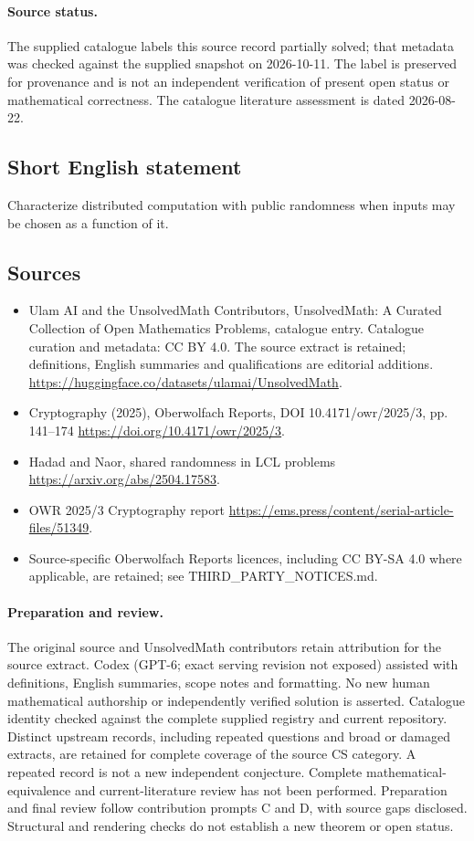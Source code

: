 \documentclass[11pt]{article}
\begin{document}
\paragraph{Source status.}
The supplied catalogue labels this source record partially solved; that metadata was checked against the supplied snapshot on 2026-10-11. The label is preserved for provenance and is not an independent verification of present open status or mathematical correctness. The catalogue literature assessment is dated 2026-08-22.
\subsection{Short English statement}
Characterize distributed computation with public randomness when inputs may be chosen as a function of it.
\subsection{Sources}
\begin{itemize}
\item[S1] Ulam AI and the UnsolvedMath Contributors, UnsolvedMath: A Curated Collection of Open Mathematics Problems, catalogue entry. Catalogue curation and metadata: CC BY 4.0. The source extract is retained; definitions, English summaries and qualifications are editorial additions.
\url{https://huggingface.co/datasets/ulamai/UnsolvedMath}.
\item[S2] Cryptography (2025), Oberwolfach Reports, DOI 10.4171/owr/2025/3, pp. 141--174
\url{https://doi.org/10.4171/owr/2025/3}.
\item[S3] Hadad and Naor, shared randomness in LCL problems
\url{https://arxiv.org/abs/2504.17583}.
\item[S4] OWR 2025/3 Cryptography report
\url{https://ems.press/content/serial-article-files/51349}.
\item Source-specific Oberwolfach Reports licences, including CC BY-SA 4.0 where applicable, are retained; see THIRD\_PARTY\_NOTICES.md.
\end{itemize}
\paragraph{Preparation and review.}
The original source and UnsolvedMath contributors retain attribution for the source extract. Codex (GPT-6; exact serving revision not exposed) assisted with definitions, English summaries, scope notes and formatting. No new human mathematical authorship or independently verified solution is asserted. Catalogue identity checked against the complete supplied registry and current repository. Distinct upstream records, including repeated questions and broad or damaged extracts, are retained for complete coverage of the source CS category. A repeated record is not a new independent conjecture. Complete mathematical-equivalence and current-literature review has not been performed. Preparation and final review follow contribution prompts C and D, with source gaps disclosed. Structural and rendering checks do not establish a new theorem or open status.
\label{end:statement}
\end{document}
